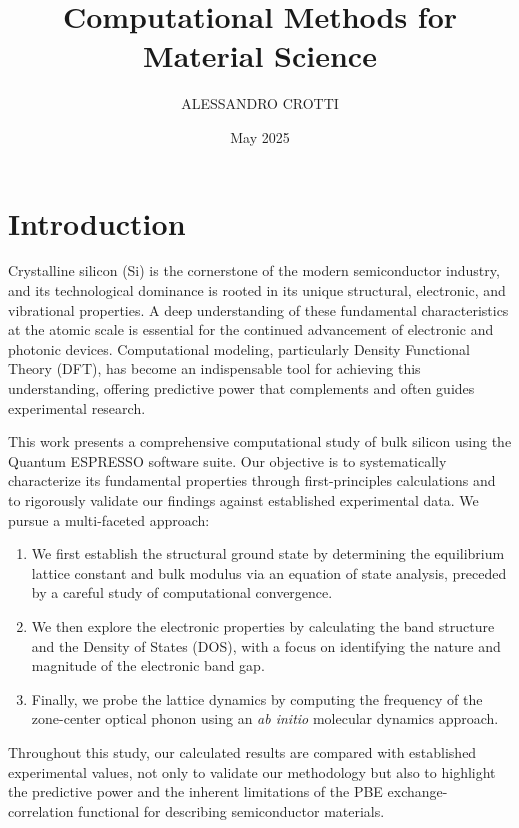 \documentclass{article}
\title{Computational Methods for Material Science}
\author{ALESSANDRO CROTTI}
\date{May 2025}
\begin{document}
\maketitle


\section{Introduction}

Crystalline silicon (Si) is the cornerstone of the modern semiconductor industry, and its technological dominance is rooted in its unique structural, electronic, and vibrational properties. A deep understanding of these fundamental characteristics at the atomic scale is essential for the continued advancement of electronic and photonic devices. Computational modeling, particularly Density Functional Theory (DFT), has become an indispensable tool for achieving this understanding, offering predictive power that complements and often guides experimental research.

This work presents a comprehensive computational study of bulk silicon using the Quantum ESPRESSO software suite. Our objective is to systematically characterize its fundamental properties through first-principles calculations and to rigorously validate our findings against established experimental data. We pursue a multi-faceted approach:
\begin{enumerate}
    \item We first establish the structural ground state by determining the equilibrium lattice constant and bulk modulus via an equation of state analysis, preceded by a careful study of computational convergence.
    \item We then explore the electronic properties by calculating the band structure and the Density of States (DOS), with a focus on identifying the nature and magnitude of the electronic band gap.
    \item Finally, we probe the lattice dynamics by computing the frequency of the zone-center optical phonon using an \textit{ab initio} molecular dynamics approach.
\end{enumerate}

Throughout this study, our calculated results are compared with established experimental values, not only to validate our methodology but also to highlight the predictive power and the inherent limitations of the PBE exchange-correlation functional for describing semiconductor materials.
\end{document}
